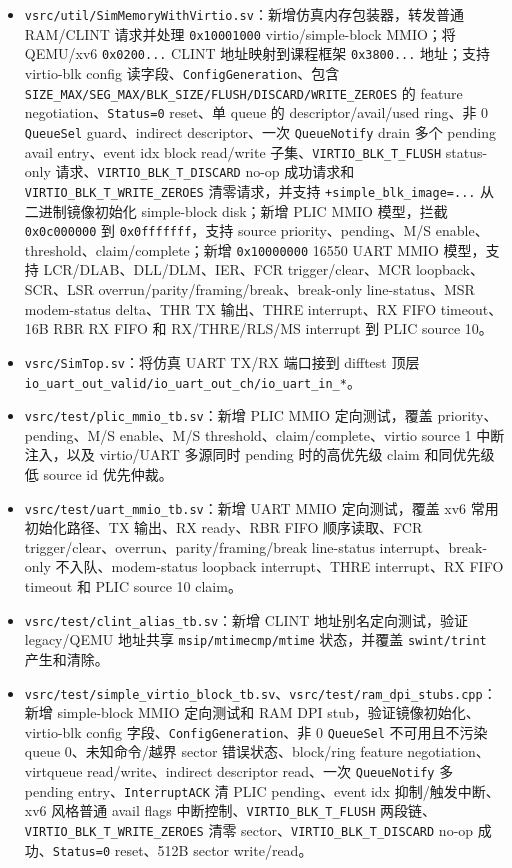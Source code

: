 \documentclass[UTF8,a4paper,11pt]{ctexart}
\begin{document}
\begin{itemize}
  \item \texttt{vsrc/util/SimMemoryWithVirtio.sv}：新增仿真内存包装器，转发普通 RAM/CLINT 请求并处理 \texttt{0x10001000} virtio/simple-block MMIO；将 QEMU/xv6 \texttt{0x0200...} CLINT 地址映射到课程框架 \texttt{0x3800...} 地址；支持 virtio-blk config 读字段、\texttt{ConfigGeneration}、包含 \texttt{SIZE\_MAX/SEG\_MAX/BLK\_SIZE/FLUSH/DISCARD/WRITE\_ZEROES} 的 feature negotiation、\texttt{Status=0} reset、单 queue 的 descriptor/avail/used ring、非 0 \texttt{QueueSel} guard、indirect descriptor、一次 \texttt{QueueNotify} drain 多个 pending avail entry、event idx block read/write 子集、\texttt{VIRTIO\_BLK\_T\_FLUSH} status-only 请求、\texttt{VIRTIO\_BLK\_T\_DISCARD} no-op 成功请求和 \texttt{VIRTIO\_BLK\_T\_WRITE\_ZEROES} 清零请求，并支持 \texttt{+simple\_blk\_image=...} 从二进制镜像初始化 simple-block disk；新增 PLIC MMIO 模型，拦截 \texttt{0x0c000000} 到 \texttt{0x0fffffff}，支持 source priority、pending、M/S enable、threshold、claim/complete；新增 \texttt{0x10000000} 16550 UART MMIO 模型，支持 LCR/DLAB、DLL/DLM、IER、FCR trigger/clear、MCR loopback、SCR、LSR overrun/parity/framing/break、break-only line-status、MSR modem-status delta、THR TX 输出、THRE interrupt、RX FIFO timeout、16B RBR RX FIFO 和 RX/THRE/RLS/MS interrupt 到 PLIC source 10。
  \item \texttt{vsrc/SimTop.sv}：将仿真 UART TX/RX 端口接到 difftest 顶层 \texttt{io\_uart\_out\_valid/io\_uart\_out\_ch/io\_uart\_in\_*}。
  \item \texttt{vsrc/test/plic\_mmio\_tb.sv}：新增 PLIC MMIO 定向测试，覆盖 priority、pending、M/S enable、M/S threshold、claim/complete、virtio source 1 中断注入，以及 virtio/UART 多源同时 pending 时的高优先级 claim 和同优先级低 source id 优先仲裁。
  \item \texttt{vsrc/test/uart\_mmio\_tb.sv}：新增 UART MMIO 定向测试，覆盖 xv6 常用初始化路径、TX 输出、RX ready、RBR FIFO 顺序读取、FCR trigger/clear、overrun、parity/framing/break line-status interrupt、break-only 不入队、modem-status loopback interrupt、THRE interrupt、RX FIFO timeout 和 PLIC source 10 claim。
  \item \texttt{vsrc/test/clint\_alias\_tb.sv}：新增 CLINT 地址别名定向测试，验证 legacy/QEMU 地址共享 \texttt{msip/mtimecmp/mtime} 状态，并覆盖 \texttt{swint/trint} 产生和清除。
  \item \texttt{vsrc/test/simple\_virtio\_block\_tb.sv}、\texttt{vsrc/test/ram\_dpi\_stubs.cpp}：新增 simple-block MMIO 定向测试和 RAM DPI stub，验证镜像初始化、virtio-blk config 字段、\texttt{ConfigGeneration}、非 0 \texttt{QueueSel} 不可用且不污染 queue 0、未知命令/越界 sector 错误状态、block/ring feature negotiation、virtqueue read/write、indirect descriptor read、一次 \texttt{QueueNotify} 多 pending entry、\texttt{InterruptACK} 清 PLIC pending、event idx 抑制/触发中断、xv6 风格普通 avail flags 中断控制、\texttt{VIRTIO\_BLK\_T\_FLUSH} 两段链、\texttt{VIRTIO\_BLK\_T\_WRITE\_ZEROES} 清零 sector、\texttt{VIRTIO\_BLK\_T\_DISCARD} no-op 成功、\texttt{Status=0} reset、512B sector write/read。

\end{itemize}
\end{document}
